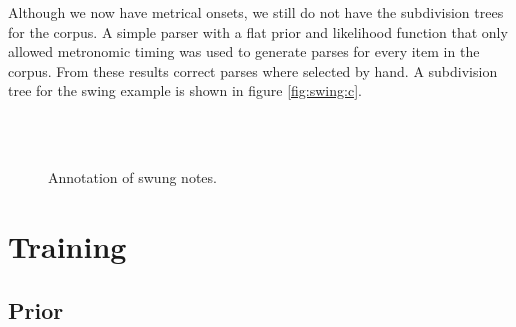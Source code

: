 Although we now have metrical onsets, we still do not have the subdivision trees for the corpus. A simple parser with a flat prior and likelihood function that only allowed metronomic timing was used to generate parses for every item in the corpus. From these results correct parses where selected by hand. A subdivision tree for the swing example is shown in figure \ref{fig:swing:c}.


\begin{figure}
\centering
{}
\\
\\
\caption{Annotation of swung notes.}
\end{figure}



\section{Training}

\subsection{Prior}



